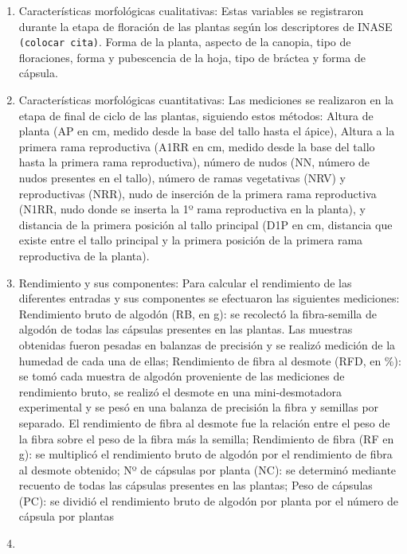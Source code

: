 \documentclass[12pt,oneside]{reedthesis}
\begin{document}
\begin{enumerate}
\def\labelenumi{\roman{enumi})}
\item
  Características morfológicas cualitativas: Estas variables se registraron durante la etapa de floración de las plantas según los descriptores de INASE \texttt{(colocar\ cita)}. Forma de la planta, aspecto de la canopia, tipo de floraciones, forma y pubescencia de la hoja, tipo de bráctea y forma de cápsula.
\item
  Características morfológicas cuantitativas: Las mediciones se realizaron en la etapa de final de ciclo de las plantas, siguiendo estos métodos: Altura de planta (AP en cm, medido desde la base del tallo hasta el ápice), Altura a la primera rama reproductiva (A1RR en cm, medido desde la base del tallo hasta la primera rama reproductiva), número de nudos (NN, número de nudos presentes en el tallo), número de ramas vegetativas (NRV) y reproductivas (NRR), nudo de inserción de la primera rama reproductiva (N1RR, nudo donde se inserta la 1º rama reproductiva en la planta), y distancia de la primera posición al tallo principal (D1P en cm, distancia que existe entre el tallo principal y la primera posición de la primera rama reproductiva de la planta).
\item
  Rendimiento y sus componentes: Para calcular el rendimiento de las diferentes entradas y sus componentes se efectuaron las siguientes mediciones: Rendimiento bruto de algodón (RB, en g): se recolectó la fibra-semilla de algodón de todas las cápsulas presentes en las plantas. Las muestras obtenidas fueron pesadas en balanzas de precisión y se realizó medición de la humedad de cada una de ellas; Rendimiento de fibra al desmote (RFD, en \%): se tomó cada muestra de algodón proveniente de las mediciones de rendimiento bruto, se realizó el desmote en una mini-desmotadora experimental y se pesó en una balanza de precisión la fibra y semillas por separado. El rendimiento de fibra al desmote fue la relación entre el peso de la fibra sobre el peso de la fibra más la semilla; Rendimiento de fibra (RF en g): se multiplicó el rendimiento bruto de algodón por el rendimiento de fibra al desmote obtenido; Nº de cápsulas por planta (NC): se determinó mediante recuento de todas las cápsulas presentes en las plantas; Peso de cápsulas (PC): se dividió el rendimiento bruto de algodón por planta por el número de cápsula por plantas
\item

\end{enumerate}
\end{document}
